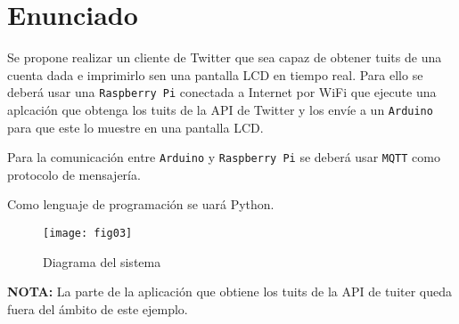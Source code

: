 \section{Enunciado}\label{enunciado}

Se propone realizar un cliente de Twitter que sea capaz de obtener tuits de una
cuenta dada e imprimirlo sen una pantalla LCD en tiempo real. Para ello se
deberá usar una \texttt{Raspberry Pi} conectada a Internet por WiFi que ejecute
una aplcación que obtenga los tuits de la API de Twitter y los envíe a un
\texttt{Arduino} para que este lo muestre en una pantalla LCD.

Para la comunicación entre \texttt{Arduino} y \texttt{Raspberry Pi} se deberá
usar \texttt{MQTT} como protocolo de mensajería.

Como lenguaje de programación se uará Python.

\begin{figure}[H]
  \centering
  \texttt{[image: fig03]}
  \caption{Diagrama del sistema}
  \label{fig:figure1}
\end{figure}

\textbf{NOTA:} La parte de la aplicación que obtiene los tuits de la API de
tuiter queda fuera del ámbito de este ejemplo.